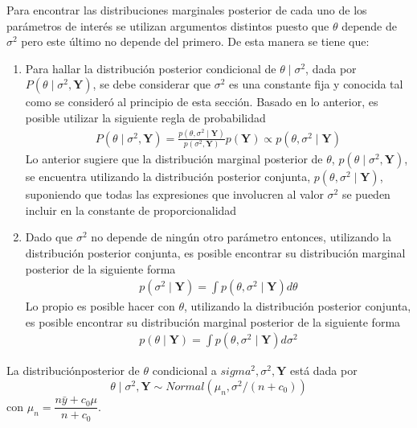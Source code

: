 Para encontrar las distribuciones marginales posterior de cada uno de los parámetros de interés se utilizan argumentos distintos puesto que $\theta$ depende de $\sigma^2$ pero este último no depende del primero. De esta manera se tiene que:
  
\begin{enumerate}
\item Para hallar la distribución posterior condicional de $\theta \mid \sigma^2$, dada por $P(\theta \mid \sigma^2,\mathbf{Y})$, se debe considerar que $\sigma^2$ es una constante fija y conocida tal como se consideró al principio de esta sección. Basado en lo anterior, es posible utilizar la siguiente regla de probabilidad
\begin{align*}
P(\theta \mid \sigma^2,\mathbf{Y})=\frac{p(\theta,\sigma^2 \mid \mathbf{Y})}{p(\sigma^2,\mathbf{Y})}p(\mathbf{Y})\propto p(\theta,\sigma^2 \mid \mathbf{Y})
\end{align*}
Lo anterior sugiere que la distribución marginal posterior de $\theta$, $p(\theta \mid \sigma^2,\mathbf{Y})$, se encuentra utilizando la distribución posterior conjunta, $p(\theta,\sigma^2 \mid \mathbf{Y})$, suponiendo que todas las expresiones que involucren al valor $\sigma^2$ se pueden incluir en la constante de proporcionalidad
\item Dado que $\sigma^2$ no depende de ningún otro parámetro entonces, utilizando la distribución posterior conjunta, es posible encontrar su distribución marginal posterior de la siguiente forma
\begin{align*}
p(\sigma^2 \mid \mathbf{Y})=\int p(\theta,\sigma^2 \mid \mathbf{Y}) d\theta
\end{align*}
Lo propio es posible hacer con $\theta$, utilizando la distribución posterior conjunta, es posible encontrar su distribución marginal posterior de la siguiente forma
\begin{align*}
p(\theta \mid \mathbf{Y})=\int p(\theta,\sigma^2 \mid \mathbf{Y}) d\sigma^2
\end{align*}
\end{enumerate}

\begin{Res}
La distribuciónposterior de $\theta$ condicional a $sigma^2,\sigma^2,\mathbf{Y}$ está dada por
\begin{equation*}
\theta \mid \sigma^2,\mathbf{Y} \sim Normal(\mu_n,\sigma^2/(n+c_0))
\end{equation*}
con $\mu_n=\dfrac{n\bar{y}+c_0\mu}{n+c_0}$.
\end{Res}

